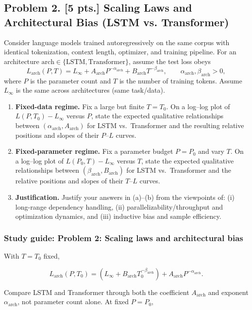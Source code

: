 \documentclass[11pt,a4paper]{article}
\begin{document}
\subsection{Problem 2. [5 pts.] Scaling Laws and Architectural Bias (LSTM vs. Transformer)}
Consider language models trained autoregressively on the same corpus with identical tokenization, context length, optimizer, and training pipeline. For an architecture $\mathrm{arch} \in \{\mathrm{LSTM}, \mathrm{Transformer}\}$, assume the test loss obeys
\[
L_{\mathrm{arch}}(P, T) = L_{\infty} + A_{\mathrm{arch}} P^{-\alpha_{\mathrm{arch}}} + B_{\mathrm{arch}} T^{-\beta_{\mathrm{arch}}}, \qquad \alpha_{\mathrm{arch}}, \beta_{\mathrm{arch}} > 0,
\]
where $P$ is the parameter count and $T$ is the number of training tokens. Assume $L_{\infty}$ is the same across architectures (same task/data).
\begin{enumerate}[label=(\alph*)]
    \item \textbf{Fixed-data regime.} Fix a large but finite $T = T_0$. On a log--log plot of $L(P, T_0) - L_{\infty}$ versus $P$, state the expected qualitative relationships between $(\alpha_{\mathrm{arch}}, A_{\mathrm{arch}})$ for LSTM vs.\ Transformer and the resulting relative positions and slopes of their $P$--$L$ curves.
    \item \textbf{Fixed-parameter regime.} Fix a parameter budget $P = P_0$ and vary $T$. On a log--log plot of $L(P_0, T) - L_{\infty}$ versus $T$, state the expected qualitative relationships between $(\beta_{\mathrm{arch}}, B_{\mathrm{arch}})$ for LSTM vs.\ Transformer and the relative positions and slopes of their $T$--$L$ curves.
    \item \textbf{Justification.} Justify your answers in (a)--(b) from the viewpoints of: (i) long-range dependency handling, (ii) parallelizability/throughput and optimization dynamics, and (iii) inductive bias and sample efficiency.
\end{enumerate}


\subsubsection{Study guide: Problem 2: Scaling laws and architectural bias}

With $T=T_0$ fixed,

\[
L_{\mathrm{arch}}(P,T_0)
=\left(L_\infty+B_{\mathrm{arch}}T_0^{-\beta_{\mathrm{arch}}}\right)
+A_{\mathrm{arch}}P^{-\alpha_{\mathrm{arch}}}.
\]

Compare LSTM and Transformer through both the coefficient $A_{\mathrm{arch}}$ and exponent $\alpha_{\mathrm{arch}}$, not parameter count alone. At fixed $P=P_0$,
\end{document}
